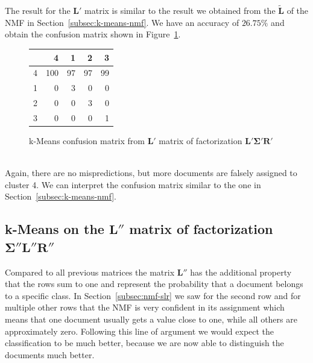 \documentclass{support/acm_proc_article-sp}
\begin{document}
    The result for the $\mathbf{{L'}}$ matrix is similar to the result we obtained from the $\mathbf{\tilde{L}}$
    of the NMF in Section~\ref{subsec:k-means-nmf}.
    We have an accuracy of $26.75\%$ and obtain the confusion matrix shown in Figure~\ref{tab:k-means-lsr}.
    \begin{figure}[htbp]
        \begin{center}
            \begin{tabular}{r | r r r r}
                & 4 & 1 & 2 & 3 \\
                \hline
                4 & 100 & 97 & 97 & 99 \\
                1 & 0 & 3 & 0 & 0 \\
                2 & 0 & 0 & 3 & 0 \\
                3 & 0 & 0 & 0 & 1
            \end{tabular}
        \end{center}
        \caption{k-Means confusion matrix from $\mathbf{{L'}}$ matrix of factorization $\mathbf{L'}\mathbf{\Sigma'}\mathbf{R'}$}
        \label{tab:k-means-lsr}
    \end{figure} \\
    Again, there are no mispredictions, but more documents are falsely assigned to cluster 4.
    We can interpret the confusion matrix similar to the one in Section~\ref{subsec:k-means-nmf}.


    \subsection{k-Means on the $\mathbf{{L''}}$ matrix of factorization $\mathbf{\Sigma''}\mathbf{L''}\mathbf{R''}$}

    Compared to all previous matrices the matrix $\mathbf{{L''}}$ has the additional property that the rows sum to
    one and represent the probability that a document belongs to a specific class.
    In Section~\ref{subsec:nmf-slr} we saw for the second row and for multiple other rows that the NMF is very confident
    in its assignment which means that one document usually gets a value close to one, while all others are approximately
    zero.
    Following this line of argument we would expect the classification to be much better, because we are now able to
    distinguish the documents much better.
\end{document}
